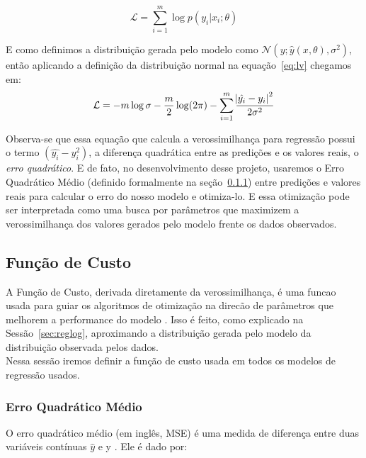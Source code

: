 \begin{equation}
  \label{eq:lv}
\mathcal{L} =  \sum^m_{i=1}\log p(y_i | x_i ; \theta)
\end{equation}

E como definimos a distribuição gerada pelo modelo como $\mathcal{N}(y ;
\hat{y}(x,\theta),\sigma^2)$, então aplicando a definição da
distribuição normal na equação~\ref{eq:lv} chegamos em: \\


\begin{equation}
\label{eq:logver}
  \mathcal{L}= -m \log \sigma - \frac{m}{2} \log (2 \pi) - \sum^m_{i=1}
  \frac{\abs{\hat{y_i}-y_i}^2}{2 \sigma^2}
\end{equation}

Observa-se que essa equação que calcula a verossimilhança para regressão possui o termo $(\hat{y_i}-y_i^2)$, a diferença
quadrática entre as predições e os valores reais, o \textit{erro quadrático}. E
de fato, no desenvolvimento desse projeto, usaremos o Erro Quadrático Médio
(definido formalmente na seção~\ref{sec:MSE}) entre
predições e valores reais para calcular o erro do nosso modelo e otimiza-lo.  
E essa otimização pode ser interpretada como uma busca por parâmetros que
maximizem a verossimilhança dos valores gerados pelo modelo frente os dados
observados. \\ 

\subsection{Função de Custo}

A Função de Custo, derivada diretamente da verossimilhança,
é uma funcao usada para guiar os algoritmos de otimização na direcão de parâmetros que melhorem a performance do modelo \cite{dlbook}. Isso é feito, como explicado na Sessão~\ref{sec:reglog}, aproximando a distribuição gerada pelo modelo da distribuição observada pelos dados. \\

Nessa sessão iremos definir a função de custo usada em todos os modelos de regressão usados. \\

\subsubsection{Erro Quadrático Médio}
\label{sec:MSE}
O erro quadrático médio (em inglês, MSE) é uma medida de diferença entre duas variáveis contínuas
$\hat{y}$ e y \citep{cohen}. Ele é dado por: \\

